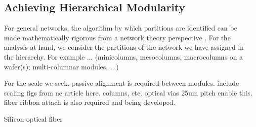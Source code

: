 \subsection{Achieving Hierarchical Modularity}
For general networks, the algorithm by which partitions are identified can be made mathematically rigorous from a network theory perspective \cite{oz1992,oz2004}. For the analysis at hand, we consider the partitions of the network we have assigned in the hierarchy. For example ... (minicolumns, mesocolumns, macrocolumns on a wafer(s); multi-columnar modules, ...)

\vspace{3em}
For the scale we seek, passive alignment is required between modules. include scaling figs from ne article here. columns, etc. optical vias 25um pitch enable this. fiber ribbon attach is also required and being developed. 

\vspace{3em}
Silicon optical fiber
\cite{baha2008,pegi2016}